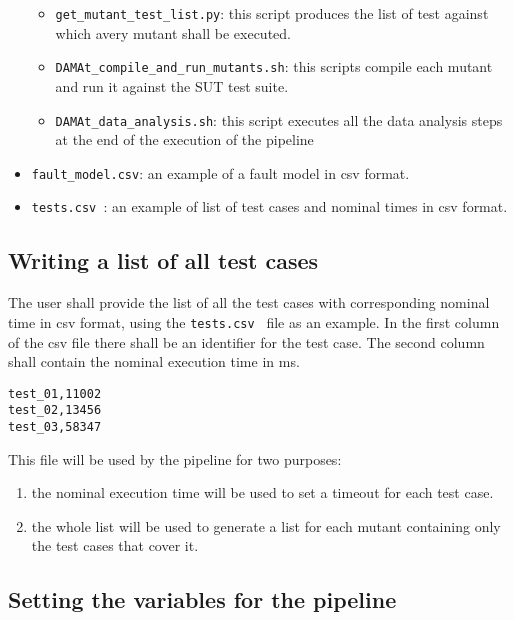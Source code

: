 \begin{itemize}
\begin{itemize}
		\item \texttt{get\_mutant\_test\_list.py}: this script produces the list of test against which avery mutant shall be executed.
	  \item \texttt{DAMAt\_compile\_and\_run\_mutants.sh}: this scripts compile each mutant and run it against the SUT test suite.
		\item \texttt{DAMAt\_data\_analysis.sh}: this script executes all the data analysis steps at the end of the execution of the \DAMA pipeline
	\end{itemize}
	\item \texttt{fault\_model.csv}: an example of a \DAMA fault model in csv format.
 	\item \texttt{tests.csv }: an example of list of test cases and nominal times in csv format.
\end{itemize}

\subsection{Writing a list of all test cases}
\label{subsec:test_list}
The user shall provide the list of all the test cases with corresponding nominal time in csv format, using the \texttt{tests.csv } file as an example.
In the first column of the csv file there shall be an identifier for the test case. The second column shall contain the nominal execution time in ms.

\begin{lstlisting}
test_01,11002
test_02,13456
test_03,58347
\end{lstlisting}

This file will be used by the \DAMA pipeline for two purposes:
\begin{enumerate}
	\item the nominal execution time will be used to set a timeout for each test case.
	\item the whole list will be used to generate a list for each mutant containing only the test cases that cover it.
\end{enumerate}

\subsection{Setting the variables for the \DAMA pipeline}


